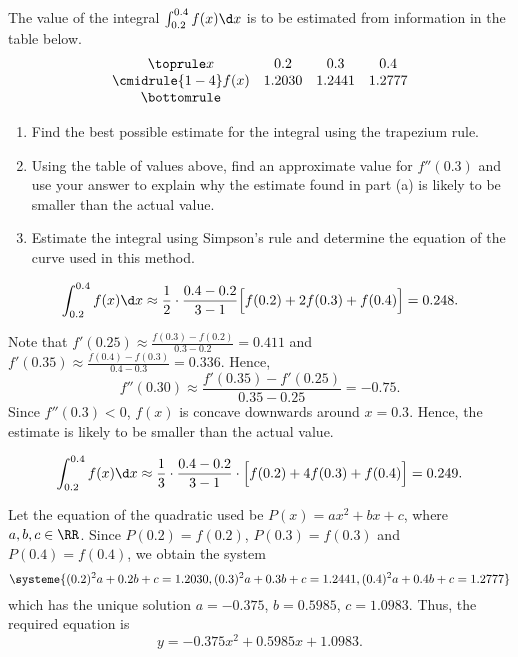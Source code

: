 \begin{problem}
    The value of the integral $\int_{0.2}^{0.4} f(x) \d x$ is to be estimated from information in the table below.
    \[
        \begin{array}{c c c c}\toprule
            x & 0.2 & 0.3 & 0.4 \\\cmidrule{1-4}
            f(x) & 1.2030 & 1.2441 & 1.2777\\\bottomrule
        \end{array}
    \]

    \begin{enumerate}
        \item Find the best possible estimate for the integral using the trapezium rule.
        \item Using the table of values above, find an approximate value for $f''(0.3)$ and use your answer to explain why the estimate found in part (a) is likely to be smaller than the actual value.
        \item Estimate the integral using Simpson's rule and determine the equation of the curve used in this method.
    \end{enumerate}
\end{problem}
\begin{solution}
    \begin{ppart}
        \[\int_{0.2}^{0.4} f(x) \d x \approx \frac12 \cdot \frac{0.4 - 0.2}{3 - 1} \Big[f(0.2) + 2f(0.3) + f(0.4)\Big] = 0.248.\]
    \end{ppart}
    \begin{ppart}
        Note that $f'(0.25) \approx \frac{f(0.3) - f(0.2)}{0.3 - 0.2} = 0.411$ and $f'(0.35) \approx \frac{f(0.4) - f(0.3)}{0.4 - 0.3} = 0.336$. Hence, \[f''(0.30) \approx \frac{f'(0.35) - f'(0.25)}{0.35 - 0.25} = -0.75.\] Since $f''(0.3) < 0$, $f(x)$ is concave downwards around $x = 0.3$. Hence, the estimate is likely to be smaller than the actual value.
    \end{ppart}
    \begin{ppart}
        \[\int_{0.2}^{0.4} f(x) \d x \approx \frac13 \cdot \frac{0.4-0.2}{3 - 1} \cdot \Big[f(0.2) + 4f(0.3) + f(0.4)\Big] = 0.249.\]

        Let the equation of the quadratic used be $P(x) = ax^2 + bx + c$, where $a, b, c \in \RR$. Since $P(0.2) = f(0.2)$, $P(0.3) = f(0.3)$ and $P(0.4) = f(0.4)$, we obtain the system \[\systeme{(0.2)^2a + 0.2 b + c = 1.2030, (0.3)^2a + 0.3 b + c = 1.2441, (0.4)^2a + 0.4 b + c = 1.2777}\] which has the unique solution $a = -0.375$, $b = 0.5985$, $c = 1.0983$. Thus, the required equation is \[y = -0.375x^2 + 0.5985x + 1.0983.\]
    \end{ppart}
\end{solution}

